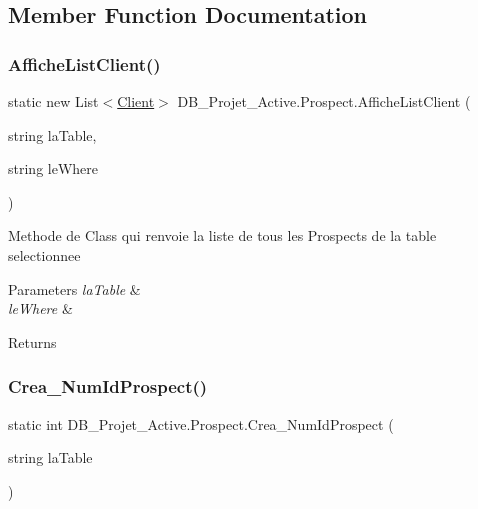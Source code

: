 \subsection{Member Function Documentation}
\mbox{\label{class_d_b___projet___active_1_1_prospect_af8f3cecf1bebd492ee02c3bfd92253bb}} 
\subsubsection{\texorpdfstring{AfficheListClient()}{AfficheListClient()}}
{\footnotesize\ttfamily static new List$<$\mbox{\hyperlink{class_d_b___projet___active_1_1_client}{Client}}$>$ D\+B\+\_\+\+Projet\+\_\+\+Active.\+Prospect.\+Affiche\+List\+Client (\begin{DoxyParamCaption}\item[{string}]{la\+Table,  }\item[{string}]{le\+Where }\end{DoxyParamCaption})\hspace{0.3cm}{\ttfamily [static]}}



Methode de Class qui renvoie la liste de tous les Prospects de la table selectionnee 


\begin{DoxyParams}{Parameters}
{\em la\+Table} & \\
\hline
{\em le\+Where} & \\
\hline
\end{DoxyParams}
\begin{DoxyReturn}{Returns}

\end{DoxyReturn}
\mbox{\label{class_d_b___projet___active_1_1_prospect_aa2fe650d83b5a4db37cc8aa1d7e1983c}} 
\subsubsection{\texorpdfstring{Crea\_NumIdProspect()}{Crea\_NumIdProspect()}}
{\footnotesize\ttfamily static int D\+B\+\_\+\+Projet\+\_\+\+Active.\+Prospect.\+Crea\+\_\+\+Num\+Id\+Prospect (\begin{DoxyParamCaption}\item[{string}]{la\+Table }\end{DoxyParamCaption})\hspace{0.3cm}{\ttfamily [static]}}



